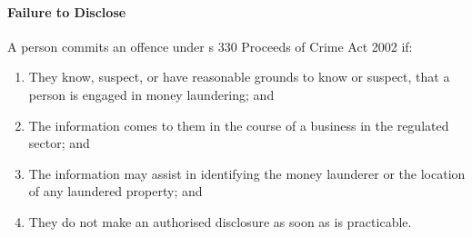\documentclass[
]{article}
\providecommand{\tightlist}{%
  \setlength{\itemsep}{0pt}\setlength{\parskip}{0pt}}
\begin{document}
\hypertarget{failure-to-disclose}{%
\paragraph{Failure to Disclose}\label{failure-to-disclose}}

A person commits an offence under s 330 Proceeds of Crime Act 2002 if:

\begin{enumerate}
\tightlist
\item
  They know, suspect, or have reasonable grounds to know or suspect,
  that a person is engaged in money laundering; and
\item
  The information comes to them in the course of a business in the
  regulated sector; and
\item
  The information may assist in identifying the money launderer or the
  location of any laundered property; and
\item
  They do not make an authorised disclosure as soon as is practicable.
\end{enumerate}
\end{document}
